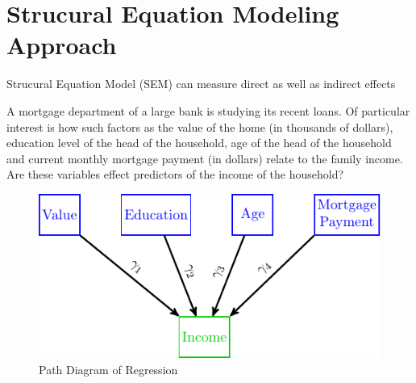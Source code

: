 \hypertarget{strucural-equation-modeling-approach}{%
\section{Strucural Equation Modeling Approach}\label{strucural-equation-modeling-approach}}

Strucural Equation Model (SEM) can measure direct as well as indirect effects


\begin{example}
A mortgage department of a large bank is studying its recent loans. Of particular interest is how such factors as the value of the home (in thousands of dollars), education level of the head of the household, age of the head of the household and current monthly mortgage payment (in dollars) relate to the family income. Are these variables effect predictors of the income of the household?
\end{example}

\begin{figure}[H]

{\centering \includegraphics[width=0.8\linewidth]{images/RegSEM1} 

}

\caption{Path Diagram of Regression}\label{fig:RegSEM1}
\end{figure}

